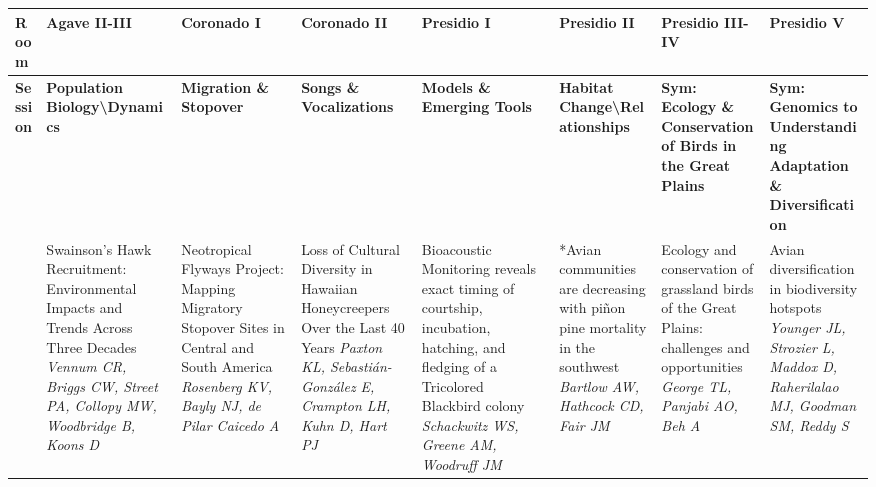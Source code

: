 \begin{tabular}{|x{0.85cm}|x{2.85cm}|x{2.85cm}|x{2.85cm}|x{2.85cm}|x{2.85cm}|a{2.85cm}|a{2.85cm}|}\hline
Room & Agave II-III & Coronado I & Coronado II & Presidio I & Presidio II & Presidio III-IV & Presidio V\\
\hline
\rule{0pt}{1em} \textbf{Session} &\footnotesize \textbf{Population Biology\textbackslash Dynamics} & \footnotesize \textbf{Migration \& Stopover} & \footnotesize \textbf{Songs \& Vocalizations} & \footnotesize \textbf{Models \& Emerging Tools} & \footnotesize \textbf{Habitat Change\textbackslash Relationships} & \footnotesize \textbf{Sym: Ecology \& Conservation of Birds in the Great Plains} & \footnotesize \textbf{Sym: Genomics to Understanding Adaptation \& Diversification}\\
\hline
{}&Swainson's Hawk Recruitment: Environmental Impacts and Trends Across Three Decades \newline \newline \textit{Vennum CR, Briggs CW, Street PA, Collopy MW, Woodbridge B, Koons D} & Neotropical Flyways Project: Mapping Migratory Stopover Sites in Central and South America \newline \newline \textit{Rosenberg KV, Bayly NJ, de Pilar Caicedo A} & Loss of Cultural Diversity in Hawaiian Honeycreepers Over the Last 40 Years \newline \newline \textit{Paxton KL, Sebasti\'{a}n-Gonz\'{a}lez E, Crampton LH, Kuhn D, Hart PJ} & Bioacoustic Monitoring reveals exact timing of courtship, incubation, hatching, and fledging of a Tricolored Blackbird colony \newline \newline \textit{Schackwitz WS, Greene AM, Woodruff JM} & *Avian communities are decreasing with pi\~{n}on pine mortality in the southwest \newline \newline \textit{Bartlow AW, Hathcock CD, Fair JM} & Ecology and conservation of grassland birds of the Great Plains: challenges and opportunities \newline \newline \textit{George TL, Panjabi AO, Beh A} & Avian diversification in biodiversity hotspots \newline \newline \textit{Younger JL, Strozier L, Maddox D, Raherilalao MJ, Goodman SM, Reddy S}\\
\hline

\end{tabular}

